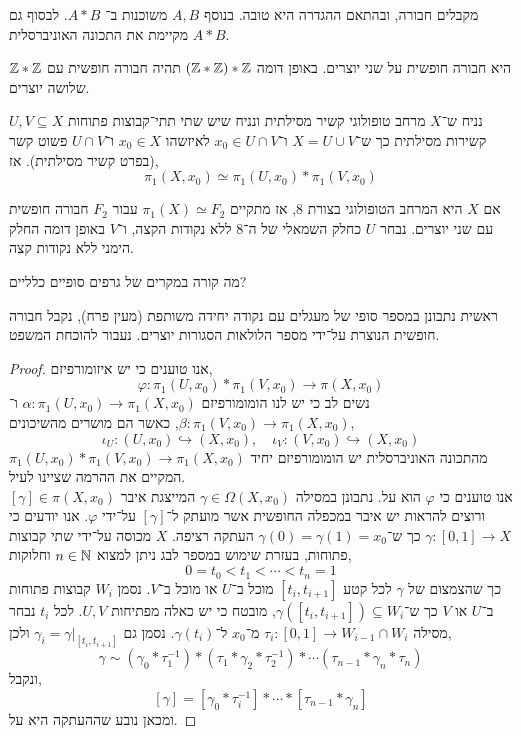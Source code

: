 \begin{exercise}
	מקבלים חבורה, ובהתאם ההגדרה היא טובה.
	בנוסף $A, B$ משוכנות ב־ $A * B$.
	לבסוף גם $A * B$ מקיימת את התכונה האוניברסלית.
\end{exercise}
\begin{remark}
	$\mathbb{Z} * \mathbb{Z}$ היא חבורה חופשית על שני יוצרים.
	באופן דומה $(\mathbb{Z} * \mathbb{Z}) * \mathbb{Z}$ תהיה חבורה חופשית עם שלושה יוצרים.
\end{remark}
\begin{theorem}
	נניח ש־$X$ מרחב טופולוגי קשיר מסילתית ונניח שיש שתי תתי־קבוצות פתוחות $U, V \subseteq X$ קשירות מסילתית כך ש־$X = U \cup V$ ו־$x_0 \in U \cap V$ לאיזשהו $x_0 \in X$ ו־$U \cap V$ פשוט קשר (בפרט קשיר מסילתית).
	אז,
	\[
		\pi_1(X, x_0)
		\simeq \pi_1(U, x_0) * \pi_1(V, x_0)
	\]
\end{theorem}
\begin{conclusion}
	אם $X$ היא המרחב הטופולוגי בצורת 8, אז מתקיים $\pi_1(X) \simeq F_2$ עבור $F_2$ חבורה חופשית עם שני יוצרים.
	נבחר $U$ כחלק השמאלי של ה־8 ללא נקודות הקצה, ו־$V$ באופן דומה החלק הימני ללא נקודות קצה.
\end{conclusion}
\begin{exercise}
	מה קורה במקרים של גרפים סופיים כלליים?
\end{exercise}
ראשית נתבונן במספר סופי של מעגלים עם נקודה יחידה משותפת (מעין פרח), נקבל חבורה חופשית הנוצרת על־ידי מספר הלולאות הסגורות יוצרים.
נעבור להוכחת המשפט.
\begin{proof}
	אנו טוענים כי יש איזומורפיזם,
	\[
		\varphi : \pi_1(U, x_0) * \pi_1(V, x_0) \to \pi(X, x_0)
	\]
	נשים לב כי יש לנו הומומורפיזם $\alpha : \pi_1(U, x_0) \to \pi_1(X, x_0)$ ו־$\beta : \pi_1(V, x_0) \to \pi_1(X, x_0)$, כאשר הם מושרים מהשיכונים,
	\[
		\iota_U : (U, x_0) \hookrightarrow (X, x_0),
		\quad
		\iota_V : (V, x_0) \hookrightarrow (X, x_0)
	\]
	מהתכונה האוניברסלית יש הומומורפיזם יחיד $\pi_1(U, x_0) * \pi_1(V, x_0) \to \pi_1(X, x_0)$ המקיים את ההרמה שציינו לעיל. \\
	אנו טוענים כי $\varphi$ הוא על.
	נתבונן במסילה $\gamma \in \Omega(X, x_0)$ המייצגת איבר $[\gamma] \in \pi(X, x_0)$ ורוצים להראות יש איבר במכפלה החופשית אשר מועתק ל־$[\gamma]$ על־ידי $\varphi$.
	אנו יודעים כי $\gamma : [0, 1] \to X$ כך ש־$\gamma(0) = \gamma(1) = x_0$ העתקה רציפה.
	$X$ מכוסה על־ידי שתי קבוצות פתוחות, בעזרת שימוש במספר לבג ניתן למצוא $n \in \mathbb{N}$ וחלוקות,
	\[
		0 = t_0 < t_1 < \cdots < t_n = 1
	\]
	כך שהצמצום של $\gamma$ לכל קטע $[t_i, t_{i + 1}]$ מוכל ב־$U$ או מוכל ב־$V$.
	נסמן $W_i$ קבוצות פתוחות ב־$U$ או $V$ כך ש־$\gamma([t_i, t_{i + 1}]) \subseteq W_i$, מובטח כי יש כאלה מפתיחות $U, V$.
	לכל $t_i$ נבחר מסילה $\tau_i : [0, 1] \to W_{i - 1} \cap W_i$ מ־$x_0$ ל־$\gamma(t_i)$.
	נסמן גם $\gamma_i = \gamma |_{[t_i, t_{i + 1}]}$ ולכן,
	\[
		\gamma
	\sim (\gamma_0 * \tau_1^{-1}) * (\tau_1 * \gamma_2 * \tau_2^{-1}) * \cdots (\tau_{n - 1} * \gamma_n * \tau_n)
	\]
	ונקבל,
	\[
		[\gamma] = [\gamma_0 * \tau_i^{-1}] * \cdots * [\tau_{n - 1} * \gamma_n]
	\]
	ומכאן נובע שההעתקה היא על.
\end{proof}

